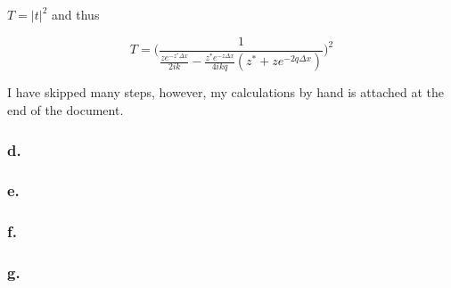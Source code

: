 \documentclass{article}
\begin{document}
$T = |t|^2$ and thus

\begin{equation}
T = \bigg( \frac{1}{\frac{ze^{-z^*\Delta x}}{2ik} - \frac{z^*e^{-z\Delta x}}{4ikq}(z^* + ze^{-2q\Delta x})} \bigg)^2
\end{equation}

I have skipped many steps, however, my calculations by hand is attached at the end of the document.

\subsubsection*{d.}

\subsubsection*{e.}

\subsubsection*{f.}

\subsubsection*{g.}
\end{document}
